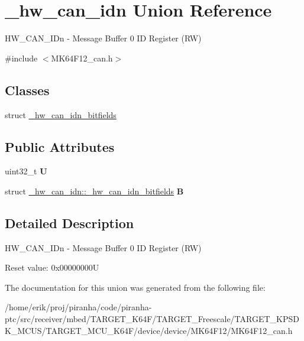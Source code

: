 \hypertarget{union__hw__can__idn}{}\section{\+\_\+hw\+\_\+can\+\_\+idn Union Reference}
\label{union__hw__can__idn}


H\+W\+\_\+\+C\+A\+N\+\_\+\+I\+Dn -\/ Message Buffer 0 ID Register (RW)  




{\ttfamily \#include $<$M\+K64\+F12\+\_\+can.\+h$>$}

\subsection*{Classes}
\begin{DoxyCompactItemize}
\item 
struct \hyperlink{struct__hw__can__idn_1_1__hw__can__idn__bitfields}{\+\_\+hw\+\_\+can\+\_\+idn\+\_\+bitfields}
\end{DoxyCompactItemize}
\subsection*{Public Attributes}
\begin{DoxyCompactItemize}
\item 
uint32\+\_\+t {\bfseries U}\hypertarget{union__hw__can__idn_ac2bc800e141cde296cba75c0a2809d67}{}\label{union__hw__can__idn_ac2bc800e141cde296cba75c0a2809d67}

\item 
struct \hyperlink{struct__hw__can__idn_1_1__hw__can__idn__bitfields}{\+\_\+hw\+\_\+can\+\_\+idn\+::\+\_\+hw\+\_\+can\+\_\+idn\+\_\+bitfields} {\bfseries B}\hypertarget{union__hw__can__idn_aec125002989a95db996c9b002ca44e63}{}\label{union__hw__can__idn_aec125002989a95db996c9b002ca44e63}

\end{DoxyCompactItemize}


\subsection{Detailed Description}
H\+W\+\_\+\+C\+A\+N\+\_\+\+I\+Dn -\/ Message Buffer 0 ID Register (RW) 

Reset value\+: 0x00000000U 

The documentation for this union was generated from the following file\+:\begin{DoxyCompactItemize}
\item 
/home/erik/proj/piranha/code/piranha-\/ptc/src/receiver/mbed/\+T\+A\+R\+G\+E\+T\+\_\+\+K64\+F/\+T\+A\+R\+G\+E\+T\+\_\+\+Freescale/\+T\+A\+R\+G\+E\+T\+\_\+\+K\+P\+S\+D\+K\+\_\+\+M\+C\+U\+S/\+T\+A\+R\+G\+E\+T\+\_\+\+M\+C\+U\+\_\+\+K64\+F/device/device/\+M\+K64\+F12/M\+K64\+F12\+\_\+can.\+h\end{DoxyCompactItemize}
